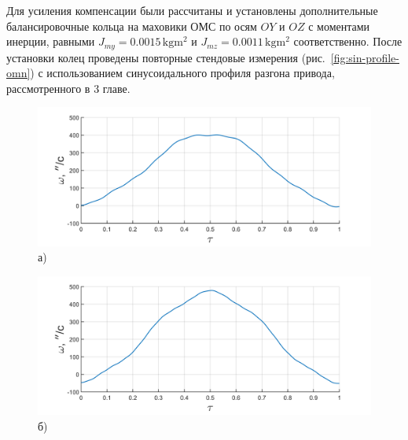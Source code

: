 Для усиления компенсации были рассчитаны и установлены дополнительные балансировочные кольца на маховики ОМС  по осям $OY$ и $OZ$ с моментами инерции, равными $J_{my}=\num{0.0015}\,\si{\kilo\gram\meter\squared}$ и $J_{mz}=\num{0.0011}\,\si{\kilo\gram\meter\squared}$ соответственно. После установки колец проведены повторные стендовые измерения (рис.~\cref{fig:sin-profile-omn}) с использованием синусоидального профиля разгона привода, рассмотренного в 3 главе.
\begin{figure}[h!]
	\begin{minipage}[b]{0.49\linewidth}\centering
		\includegraphics[width=\linewidth]{matlab/img/oz-gyro-sin-vel} \\ а) 
	\end{minipage}
	\hfill
	\begin{minipage}[b]{0.49\linewidth}\centering
		\includegraphics[width=\linewidth]{matlab/img/oy-gyro-sin-vel} \\ б)
	\end{minipage}
	
	\vspace{0.5em} %
	

\end{figure}
